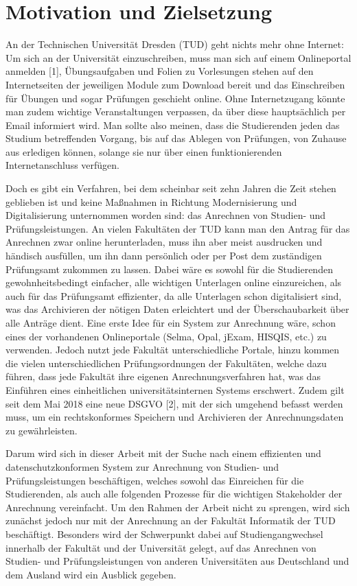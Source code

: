 \chapter{ Motivation und Zielsetzung}

An der Technischen Universität Dresden (TUD) geht nichts mehr ohne Internet: Um sich an der Universität einzuschreiben, muss man sich auf einem Onlineportal anmelden [1], Übungsaufgaben und Folien zu Vorlesungen stehen auf den Internetseiten der jeweiligen Module zum Download bereit und das Einschreiben für Übungen und sogar Prüfungen geschieht online. Ohne Internetzugang könnte man zudem wichtige Veranstaltungen verpassen, da über diese hauptsächlich per Email informiert wird. Man sollte also meinen, dass die Studierenden jeden das Studium betreffenden Vorgang, bis auf das Ablegen von Prüfungen, von Zuhause aus erledigen können, solange sie nur über einen funktionierenden Internetanschluss verfügen.

Doch es gibt ein Verfahren, bei dem scheinbar seit zehn Jahren die Zeit stehen geblieben ist und keine Maßnahmen in Richtung Modernisierung und Digitalisierung unternommen worden sind: das Anrechnen von Studien- und Prüfungsleistungen. An vielen Fakultäten der TUD kann man den Antrag für das Anrechnen zwar online herunterladen, muss ihn aber meist ausdrucken und händisch ausfüllen, um ihn dann persönlich oder per Post dem zuständigen Prüfungsamt zukommen zu lassen. Dabei wäre es sowohl für die Studierenden gewohnheitsbedingt einfacher, alle wichtigen Unterlagen online einzureichen, als auch für das Prüfungsamt effizienter, da alle Unterlagen schon digitalisiert sind, was das Archivieren der nötigen Daten erleichtert und der Überschaubarkeit über alle Anträge dient. Eine erste Idee für ein System zur Anrechnung wäre, schon eines der vorhandenen Onlineportale (Selma, Opal, jExam, HISQIS, etc.) zu verwenden. Jedoch nutzt jede Fakultät unterschiedliche Portale, hinzu kommen die vielen unterschiedlichen Prüfungsordnungen der Fakultäten, welche dazu führen, dass jede Fakultät ihre eigenen Anrechnungsverfahren hat, was das Einführen eines einheitlichen universitätsinternen Systems erschwert.
Zudem gilt seit dem Mai 2018 eine neue DSGVO [2], mit der sich umgehend befasst werden muss, um ein rechtskonformes Speichern und Archivieren der Anrechnungsdaten zu gewährleisten.

Darum wird sich in dieser Arbeit mit der Suche nach einem effizienten und datenschutzkonformen System zur Anrechnung von Studien- und Prüfungsleistungen beschäftigen, welches sowohl das Einreichen für die Studierenden, als auch alle folgenden Prozesse für die wichtigen Stakeholder der Anrechnung vereinfacht. Um den Rahmen der Arbeit nicht zu sprengen, wird sich zunächst jedoch nur mit der Anrechnung an der Fakultät Informatik der TUD beschäftigt. Besonders wird der Schwerpunkt dabei auf Studiengangwechsel innerhalb der Fakultät und der Universität gelegt, auf das Anrechnen von Studien- und Prüfungsleistungen von anderen Universitäten aus Deutschland und dem Ausland wird ein Ausblick gegeben.

